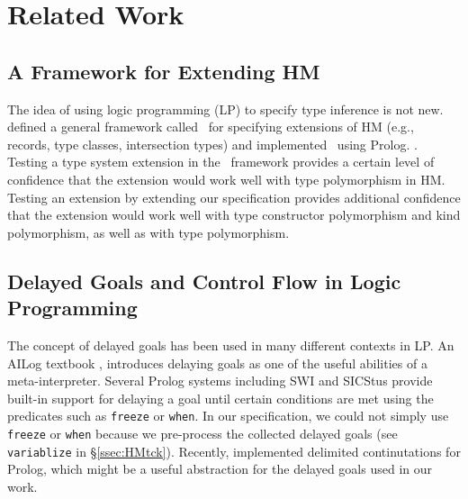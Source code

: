 \section{Related Work}\label{sec:relwork}
\subsection{A Framework for Extending HM}
The idea of using logic programming (LP) to specify type inference is not new.
\citet*{HMX99} defined a general framework called \HMX\ for specifying
extensions of HM (e.g., records, type classes, intersection types)
and \citet{tyinferCHR02} implemented \HMX\ using Prolog.
. Testing a type system extension
in the \HMX\ framework provides a certain level of confidence that the extension
would work well with type polymorphism in HM. Testing an extension by
extending our specification provides additional confidence that the extension
would work well with type constructor polymorphism and kind polymorphism,
as well as with type polymorphism.

\subsection{Delayed Goals and Control Flow in Logic Programming}
The concept of delayed goals has been used in many different contexts in LP.
An AILog
	 textbook \cite{AILogTextBook},
introduces delaying goals as one of the useful abilities of a meta-interpreter.
Several Prolog systems including SWI and SICStus provide built-in support for
delaying a goal until certain conditions are met using the predicates
such as {\small\verb|freeze|} or {\small\verb|when|}. In our specification,
we could not simply use {\small\verb|freeze|} or {\small\verb|when|}
because we pre-process the collected delayed goals (see \verb|variablize|
in \S\ref{ssec:HMtck}).
Recently, \citet{SchDemDesWei13} implemented delimited continutations for
Prolog, which might be a useful abstraction for the delayed goals 
used in our work.

